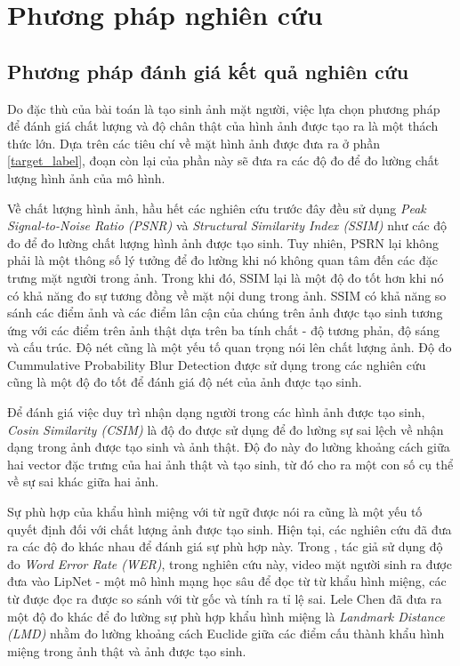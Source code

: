 \section{\texorpdfstring{Phương pháp nghiên cứu}{Method}}
\subsection{\texorpdfstring{Phương pháp đánh giá kết quả nghiên cứu}{Empty}}
Do đặc thù của bài toán là tạo sinh ảnh mặt người, việc lựa chọn phương pháp để đánh giá chất lượng và độ chân thật của hình ảnh được tạo ra là một thách thức lớn. Dựa trên các tiêu chí về mặt hình ảnh được đưa ra ở phần \ref{target_label}, đoạn còn lại của phần này sẽ đưa ra các độ đo để đo lường chất lượng hình ảnh của mô hình.

Về chất lượng hình ảnh, hầu hết các nghiên cứu trước đây \cite{chen2018}\cite{chen2019}\cite{vougioukas2019}\cite{vougioukas2020} đều sử dụng \textit{Peak Signal-to-Noise Ratio (PSNR)} và \textit{Structural Similarity Index (SSIM)} như các độ đo để đo lường chất lượng hình ảnh được tạo sinh. Tuy nhiên, PSRN lại không phải là một thông số lý tưởng để đo lường khi nó không quan tâm đến các đặc trưng mặt người trong ảnh. Trong khi đó, SSIM lại là một độ đo tốt hơn khi nó có khả năng đo sự tương đồng về mặt nội dung trong ảnh. SSIM có khả năng so sánh các điểm ảnh và các điểm lân cận của chúng trên ảnh được tạo sinh tương ứng với các điểm trên ảnh thật dựa trên ba tính chất - độ tương phản, độ sáng và cấu trúc. Độ nét cũng là một yếu tố quan trọng nói lên chất lượng ảnh. Độ đo Cummulative Probability Blur Detection được sử dụng trong các nghiên cứu \cite{chen2018}\cite{vougioukas2019}\cite{vougioukas2020}
cũng là một độ đo tốt để đánh giá độ nét của ảnh được tạo sinh.

Để đánh giá việc duy trì nhận dạng người trong các hình ảnh được tạo sinh, \textit{Cosin Similarity (CSIM)} là độ đo được sử dụng để đo lường sự sai lệch về nhận dạng trong ảnh được tạo sinh và ảnh thật. Độ đo này đo lường khoảng cách giữa hai vector đặc trưng của hai ảnh thật và tạo sinh, từ đó cho ra một con số cụ thể về sự sai khác giữa hai ảnh.

Sự phù hợp của khẩu hình miệng với từ ngữ được nói ra cũng là một yếu tố quyết định đối với chất lượng ảnh được tạo sinh. Hiện tại, các nghiên cứu đã đưa ra các độ đo khác nhau để đánh giá sự phù hợp này. Trong \cite{vougioukas2019}\cite{vougioukas2020}, tác giả sử dụng độ đo \textit{Word Error Rate (WER)}, trong nghiên cứu này, video mặt người sinh ra được đưa vào LipNet - một mô hình mạng học sâu để đọc từ từ khẩu hình miệng, các từ được đọc ra được so sánh với từ gốc và tính ra tỉ lệ sai. Lele Chen \cite{chen2018} đã đưa ra một độ đo khác để đo lường sự phù hợp khẩu hình miệng là \textit{Landmark Distance (LMD)} nhằm đo lường khoảng cách Euclide giữa các điểm cấu thành khẩu hình miệng trong ảnh thật và ảnh được tạo sinh.

